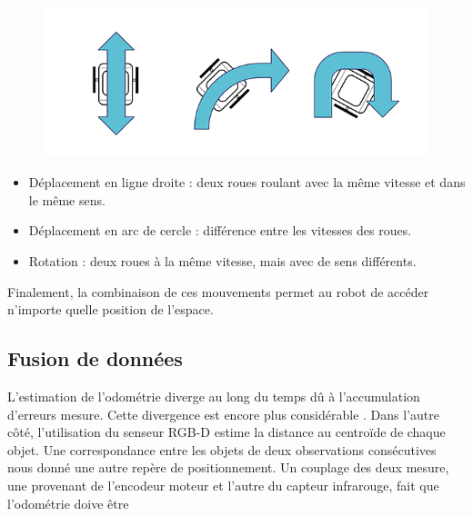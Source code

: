 \begin{figure}[H]
\includegraphics[width=\textwidth]{wbot_mov.png}
\end{figure}
\begin {itemize}
\item Déplacement en ligne droite : deux roues roulant avec la même vitesse et dans le même sens.

\item Déplacement en arc de cercle : différence entre les vitesses des roues.

\item Rotation : deux roues à la même vitesse, mais avec de sens différents.
\end{itemize}

Finalement, la combinaison de ces mouvements permet au robot de
accéder n'importe quelle position de l’espace.

\subsection{Fusion de données}

L'estimation de l’odométrie diverge au long du temps dû à
l'accumulation d'erreurs mesure. Cette divergence est encore plus
considérable . Dans l'autre côté, l'utilisation du senseur RGB-D
estime la distance au centroïde de chaque objet. Une correspondance
entre les objets de deux observations consécutives nous donné une
autre repère de positionnement. Un couplage des deux mesure, une
provenant de l’encodeur moteur et l'autre du capteur infrarouge, fait
que l'odométrie doive être

